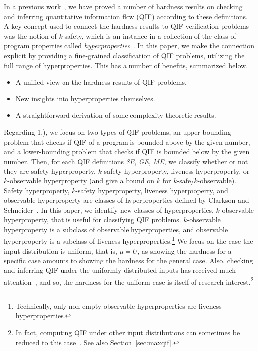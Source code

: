 \documentclass[]{eptcs}
\begin{document}
In a previous
work~\cite{DBLP:conf/csfw/YasuokaT10,DBLP:conf/esorics/YasuokaT10}, we
have proved a number of hardness results on checking and inferring
quantitative information flow (QIF) according to these definitions.  A
key concept used to connect the hardness results to QIF verification
problems was the notion of $k$-safety, which is an instance in a
collection of the class of program properties called {\em
  hyperproperties}~\cite{DBLP:journals/jcs/ClarksonS10}.  In this paper,
we make the connection explicit by providing a fine-grained
classification of QIF problems, utilizing the full range of
hyperproperties.  This has a number of benefits, summarized below.
\begin{itemize}
\item[1.)] A unified view on the hardness results of QIF problems.
\item[2.)] New insights into hyperproperties themselves.
\item[3.)] A straightforward derivation of some complexity theoretic results.
\end{itemize}
Regarding 1.), we focus on two types of QIF problems, an
upper-bounding problem that checks if QIF of a program is bounded
above by the given number, and a lower-bounding problem that checks if
QIF is bounded below by the given number.  Then, for each QIF
definitions {\it SE}, {\it GE}, {\it ME}, we classify whether or not
they are safety hyperproperty, $k$-safety hyperproperty, liveness
hyperproperty, or $k$-observable hyperproperty (and give a bound on
$k$ for $k$-safe/$k$-observable).  Safety hyperproperty, $k$-safety
hyperproperty, liveness hyperproperty, and observable hyperproperty
are classes of hyperproperties defined by Clarkson and
Schneider~\cite{DBLP:journals/jcs/ClarksonS10}.  In this paper, we
identify new classes of hyperproperties, $k$-observable hyperproperty,
that is useful for classifying QIF problems.  $k$-observable
hyperproperty is a subclass of observable hyperproperties, and
observable hyperproperty is a subclass of liveness
hyperproperties.\footnote{Technically, only non-empty observable
  hyperproperties are liveness hyperproperties.}  We focus on the case
the input distribution is uniform, that is, $\mu = U$, as showing the
hardness for a specific case amounts to showing the hardness for the
general case.  Also, checking and inferring QIF under the
uniformly distributed inputs has received much
attention~\cite{DBLP:conf/ifip1-7/HeusserM09,DBLP:conf/sp/BackesKR09,DBLP:conf/csfw/KopfR10,clark05,malacaria:popl2007,clarkjcs2007},
and so, the hardness for the uniform case is itself of research
interest.\footnote{In fact, computing QIF under other input
  distributions can sometimes be reduced to this
  case~\cite{DBLP:conf/ccs/SamaratiV10}.  See also Section~\ref{sec:maxqif}.}
\end{document}
